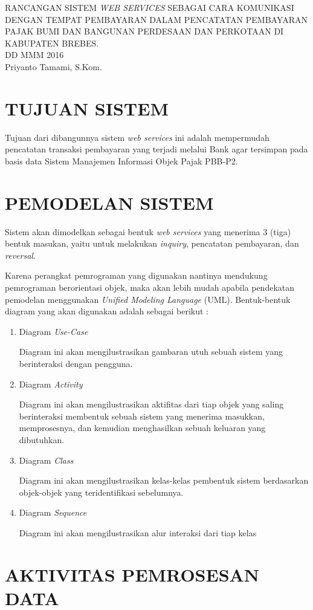 \documentclass[pdftex,12pt, oneside]{article}
\begin{document}
\sloppy %

\begin{center}
{\large RANCANGAN SISTEM \textit{WEB SERVICES} SEBAGAI CARA KOMUNIKASI DENGAN TEMPAT PEMBAYARAN DALAM PENCATATAN PEMBAYARAN PAJAK BUMI DAN BANGUNAN PERDESAAN DAN PERKOTAAN DI KABUPATEN BREBES.}
\\[1cm]
DD MMM 2016\\
Priyanto Tamami, S.Kom.
\end{center}




\section{TUJUAN SISTEM}

Tujuan dari dibangunnya sistem \textit{web services} ini adalah mempermudah pencatatan transaksi pembayaran yang terjadi melalui Bank agar tersimpan pada basis data Sistem Manajemen Informasi Objek Pajak PBB-P2.


\section{PEMODELAN SISTEM}

Sistem akan dimodelkan sebagai bentuk \textit{web services} yang menerima 3 (tiga) bentuk masukan, yaitu untuk melakukan \textit{inquiry}, pencatatan pembayaran, dan \textit{reversal}.

Karena perangkat pemrograman yang digunakan nantinya mendukung pemrograman berorientasi objek, maka akan lebih mudah apabila pendekatan pemodelan menggunakan \textit{Unified Modeling Language} (UML). Bentuk-bentuk diagram yang akan digunakan adalah sebagai berikut :

\begin{enumerate}
  \item Diagram \textit{Use-Case}
  
  Diagram ini akan mengilustrasikan gambaran utuh sebuah sistem yang berinteraksi dengan pengguna.
  
  \item Diagram \textit{Activity}
  
  Diagram ini akan mengilustrasikan aktifitas dari tiap objek yang saling berinteraksi membentuk sebuah sistem yang menerima masukkan, memprosesnya, dan kemudian menghasilkan sebuah keluaran yang dibutuhkan.
  
  \item Diagram \textit{Class}
  
  Diagram ini akan mengilustrasikan kelas-kelas pembentuk sistem berdasarkan objek-objek yang teridentifikasi sebelumnya.
  
  \item Diagram \textit{Sequence}
  
  Diagram ini akan mengilustrasikan alur interaksi dari tiap kelas 
  
\end{enumerate}




\section{AKTIVITAS PEMROSESAN DATA}
\end{document}
